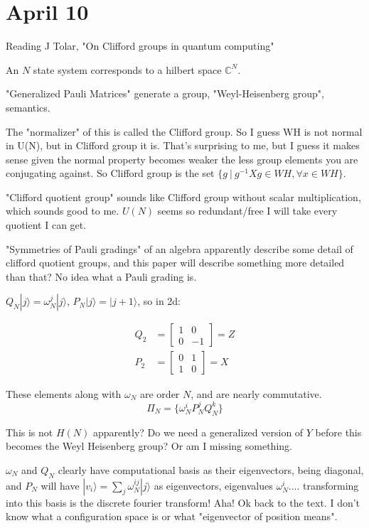 \documentclass[]{article}
\newcommand{\ket}[1]{| #1 \rangle}
\begin{document}
\section{April 10}

Reading J Tolar, "On Clifford groups in quantum computing"

An $N$ state system corresponds to a hilbert space $\mathbb{C}^N$.

"Generalized Pauli Matrices" generate a group, "Weyl-Heisenberg group", semantics.

The "normalizer" of this is called the Clifford group. So I guess WH is not normal in U(N), but in Clifford group it is. That's surprising to me, but I guess it makes sense given the normal property becomes weaker the less group elements you are conjugating against. So Clifford group is the set $\{g\ |\ g^{-1}Xg \in \textit{WH}, \forall x \in \textit{WH}\}$.

"Clifford quotient group" sounds like Clifford group without scalar multiplication, which sounds good to me. $U(N)$ seems so redundant/free I will take every quotient I can get.

"Symmetries of Pauli gradings" of an algebra apparently describe some detail of clifford quotient groups, and this paper will describe something more detailed than that? No idea what a Pauli grading is.

$Q_N\ket{j} = \omega_N^j\ket{j}$, $P_N\ket{j} = \ket{j + 1}$, so in 2d:

\begin{align*}
Q_2 &= \left[\begin{matrix}
1 & 0 \\
0 & -1
\end{matrix}\right] = Z
\\P_2 &= \left[\begin{matrix}
0 & 1 \\
1 & 0
\end{matrix}\right] = X
\end{align*}

These elements along with $\omega_N$ are order $N$, and are nearly commutative.
\[\Pi_N = \{\omega_N^i P_N^j Q_N^k\}\]

This is not $H(N)$ apparently? Do we need a generalized version of $Y$ before this becomes the Weyl Heisenberg group? Or am I missing something.

$\omega_N$ and $Q_N$ clearly have computational basis as their eigenvectors, being diagonal, and $P_N$ will have $\ket{v_i} = \sum_j \omega_N^{ij}\ket{j}$ as eigenvectors, eigenvalues $\omega_N^i$.... transforming into this basis is the discrete fourier transform! Aha! Ok back to the text. I don't know what a configuration space is or what "eigenvector of position means".
\end{document}
